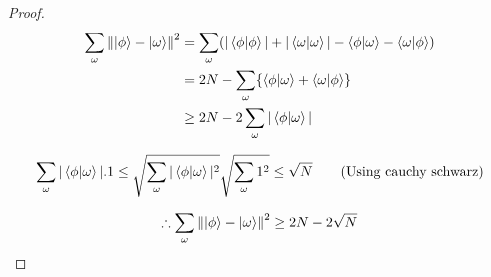 \documentclass[11.5pt, paper=a4]{article}
\theoremstyle{definition}
\numberwithin{theorem}{section}
\begin{document}
\begin{proof}
\begin{equation*}
\begin{split}
    \sum_\omega\norm{\ket{\phi}-\ket{\omega}}^2 & = \sum_\omega(|\braket{\phi|\phi}| + |\braket{\omega|\omega}| - \braket{\phi|\omega} - \braket{\omega|\phi})\\
    & = 2N - \sum_\omega\{\braket{\phi|\omega}+\braket{\omega|\phi}\}\\
    & \ge 2N - 2\sum_\omega|\braket{\phi|\omega}|
\end{split}
\end{equation*}

\begin{equation*}
    \sum_\omega|\braket{\phi|\omega}|.1 \le \sqrt{\sum_\omega|\braket{\phi|\omega}|^2}\sqrt{\sum_\omega1^2} \le \sqrt{N} \tag{Using cauchy schwarz}
\end{equation*}

\begin{equation*}
    \therefore \sum_\omega\norm{\ket{\phi}-\ket{\omega}}^2 \ge 2N - 2\sqrt{N}
\end{equation*}
\end{proof}
\end{document}
